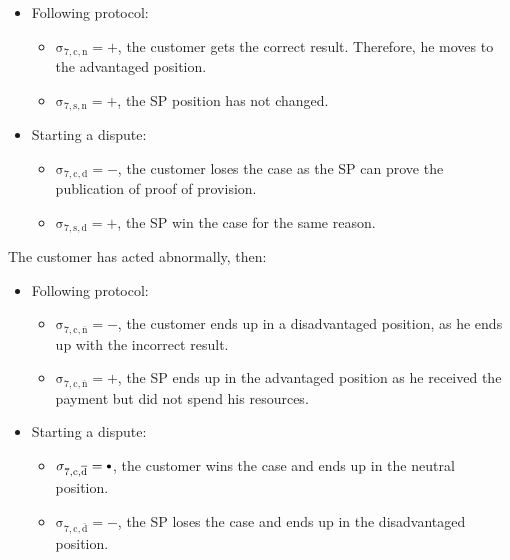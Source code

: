 \documentclass{ieeeaccess}
\newcommand\sbullet[1][.75]{\mathbin{\ThisStyle{\vcenter{\hbox{%
  \scalebox{#1}{$\SavedStyle\bullet$}}}}}%
}
\begin{document}
\begin{itemize}
\item
  Following protocol:

  \begin{itemize}
  
  \item
    \(\operatorname{\sigma_{7, c, n} = +}\), the customer gets the correct result. Therefore, he moves to the advantaged position. 
  \item
    \(\operatorname{\sigma_{7, s, n} = +}\), the SP position has not changed. 
  \end{itemize}
\item
  Starting a dispute:

  \begin{itemize}
  
  \item
    \(\operatorname{\sigma_{7, c, d} = -}\), the customer loses the case as the SP can prove the publication of proof of provision. 
  \item
    \(\operatorname{\sigma_{7, s, d} = +}\), the SP win the case for the same reason.
  \end{itemize}
\end{itemize}

The customer has acted abnormally, then:

\begin{itemize}
\item
  Following protocol:

  \begin{itemize}
  
  \item
    \(\operatorname{\sigma_{7, c, \overline{n}} = -}\), the customer ends up in a disadvantaged position, as he ends up with the incorrect result.
  \item
    \(\operatorname{\sigma_{7, c, \overline{n}} = +}\), the SP ends up in the advantaged position as he received the payment but did not spend his resources.
  \end{itemize}
\item
  Starting a dispute:

  \begin{itemize}
  
  \item
    \(\operatorname{\sigma_{7, c, \overline{d}} = \sbullet}\), the customer wins the case and ends up in the neutral position.
  \item
    \(\operatorname{\sigma_{7, c, \overline{d}} = -}\), the SP loses the case and ends up in the disadvantaged position.
  \end{itemize}
\end{itemize}
\end{document}
